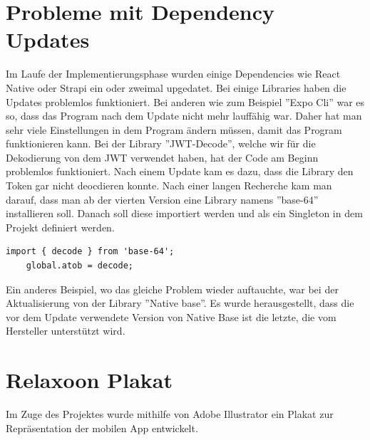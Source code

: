 \begin{spacing}{1}
\begin{quotation}
    \end{quotation}

    \section{Probleme mit Dependency Updates}

    Im Laufe der Implementierungsphase wurden einige Dependencies wie React Native oder Strapi ein oder zweimal upgedatet. Bei einige Libraries haben die Updates problemlos funktioniert. Bei anderen wie zum Beispiel ''Expo Cli'' war es so, dass das Program nach dem Update nicht mehr lauffähig war. Daher hat man sehr viele Einstellungen in dem Program ändern müssen, damit das Program funktionieren kann.
    Bei der Library ''JWT-Decode'', welche wir für die Dekodierung von dem JWT verwendet haben, hat der Code am Beginn problemlos funktioniert. Nach einem Update kam es dazu, dass die Library den Token gar nicht deocdieren konnte.
    Nach einer langen Recherche kam man darauf, dass man ab der vierten Version eine Library namens ''base-64'' installieren soll.
    Danach soll diese importiert werden und als ein Singleton in dem Projekt definiert werden.
    \begin{lstlisting}[caption=base-64 als Singleton]
    import { decode } from 'base-64';
    global.atob = decode;
    \end{lstlisting}
    \begin{quotation}
        \cite{jwt-decode-bug}

    \end{quotation}
    Ein anderes Beispiel, wo das gleiche Problem wieder auftauchte, war bei der Aktualisierung von der Library ''Native base''. Es wurde herausgestellt,
    dass die vor dem Update verwendete Version von Native Base ist die letzte, die vom Hersteller unterstützt wird.

    \section{Relaxoon Plakat}\label{sec:plakat}

    Im Zuge des Projektes wurde mithilfe von Adobe Illustrator ein Plakat zur Repräsentation der mobilen App
    entwickelt.


\end{spacing}
